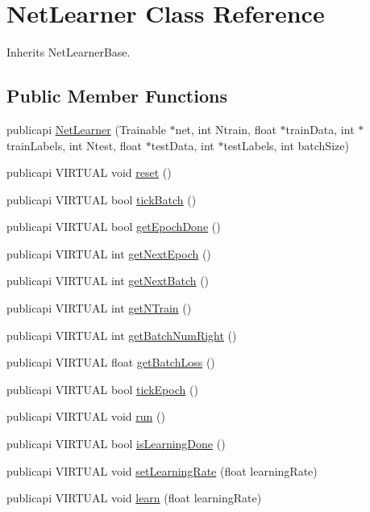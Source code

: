 \hypertarget{classNetLearner}{\section{Net\-Learner Class Reference}
\label{classNetLearner}
}


Inherits Net\-Learner\-Base.

\subsection*{Public Member Functions}
\begin{DoxyCompactItemize}
\item 
publicapi \hyperlink{classNetLearner_ae1298aec18f9b90d5631e162e5b1a7bc}{Net\-Learner} (Trainable $\ast$net, int Ntrain, float $\ast$train\-Data, int $\ast$train\-Labels, int Ntest, float $\ast$test\-Data, int $\ast$test\-Labels, int batch\-Size)
\item 
publicapi V\-I\-R\-T\-U\-A\-L void \hyperlink{classNetLearner_aaa130215f22b3da1f9f99de404a96b9b}{reset} ()
\item 
publicapi V\-I\-R\-T\-U\-A\-L bool \hyperlink{classNetLearner_a42be6ba0168298a182a702a96d488535}{tick\-Batch} ()
\item 
publicapi V\-I\-R\-T\-U\-A\-L bool \hyperlink{classNetLearner_a854531128a06cb0c19426db8ced341ba}{get\-Epoch\-Done} ()
\item 
publicapi V\-I\-R\-T\-U\-A\-L int \hyperlink{classNetLearner_a3d2a69f79e1587677ca9f348e51cffac}{get\-Next\-Epoch} ()
\item 
publicapi V\-I\-R\-T\-U\-A\-L int \hyperlink{classNetLearner_a4e3da75a8e6063d22add3cbcbd04345e}{get\-Next\-Batch} ()
\item 
publicapi V\-I\-R\-T\-U\-A\-L int \hyperlink{classNetLearner_a90889134f2ba0bbe863a99f59954f3db}{get\-N\-Train} ()
\item 
publicapi V\-I\-R\-T\-U\-A\-L int \hyperlink{classNetLearner_a8b32e57aad477db1098f787d44c7568d}{get\-Batch\-Num\-Right} ()
\item 
publicapi V\-I\-R\-T\-U\-A\-L float \hyperlink{classNetLearner_a53fd8c5f257e0ff7d08a9b5a6426fdbf}{get\-Batch\-Loss} ()
\item 
publicapi V\-I\-R\-T\-U\-A\-L bool \hyperlink{classNetLearner_a18c3ffeb8f1a3f6dac8019a8343d2c5b}{tick\-Epoch} ()
\item 
publicapi V\-I\-R\-T\-U\-A\-L void \hyperlink{classNetLearner_acb58b6fb2d24de35bf0df9f0b1b37683}{run} ()
\item 
publicapi V\-I\-R\-T\-U\-A\-L bool \hyperlink{classNetLearner_a777ce89028748d1fc22a4f4f3c0bd4a4}{is\-Learning\-Done} ()
\item 
publicapi V\-I\-R\-T\-U\-A\-L void \hyperlink{classNetLearner_a42bc02ddc7da8ca3c19abde1d1055e4c}{set\-Learning\-Rate} (float learning\-Rate)
\item 
publicapi V\-I\-R\-T\-U\-A\-L void \hyperlink{classNetLearner_a189930d926a590e56d6f0a48f8020e1d}{learn} (float learning\-Rate)
\end{DoxyCompactItemize}


